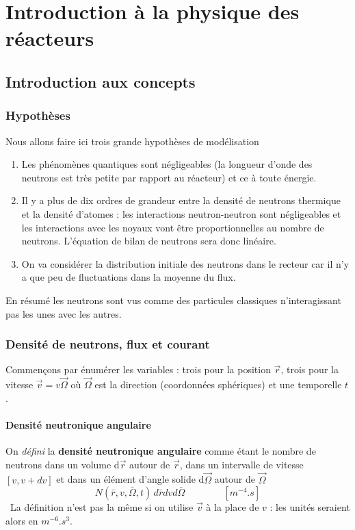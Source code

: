 \chapter{Introduction à la physique des réacteurs}
\section{Introduction aux concepts}
\subsection{Hypothèses}
Nous allons faire ici trois grande hypothèses de modélisation
\begin{enumerate}
\item Les phénomènes quantiques sont négligeables (la longueur d'onde des neutrons est très petite 
par rapport au réacteur) et ce à toute énergie.
\item Il y a plus de dix ordres de grandeur entre la densité de neutrons thermique et la densité 
d'atomes : les interactions neutron-neutron sont négligeables et les interactions avec les noyaux 
vont être proportionnelles au nombre de neutrons. L'équation de bilan de neutrons sera donc linéaire.
\item On va considérer la distribution initiale des neutrons dans le recteur car il n'y a que peu 
de fluctuations dans la moyenne du flux.
\end{enumerate}
En résumé les neutrons sont vus comme des particules classiques n'interagissant pas les unes avec 
les autres.

\subsection{Densité de neutrons, flux et courant}
Commençons par énumérer les variables : trois pour la position $\vec{r}$, trois pour la vitesse 
$\vec{v} =v\vec{\Omega}$ où $\vec\Omega$ est la direction (coordonnées sphériques) et une temporelle
$t$.

\subsubsection{Densité neutronique angulaire}
On \textit{défini} la \textbf{densité neutronique angulaire} comme étant le nombre de neutrons dans 
un volume d$\vec{r}$ autour de $\vec{r}$, dans un intervalle de vitesse $[v,v+dv]$ et dans un 
élément d'angle solide d$\vec\Omega$ autour de $\vec{\Omega}$
\begin{equation}
N(\bar r,v,\bar \Omega ,t)\,d\bar rdvd\bar \Omega\qquad\qquad [m^{-4}.s]
\end{equation}
\danger\ La définition n'est pas la même si on utilise $\vec{v}$ à la place de $v$ : les unités 
seraient alors en $m^{-6}.s^3$.

